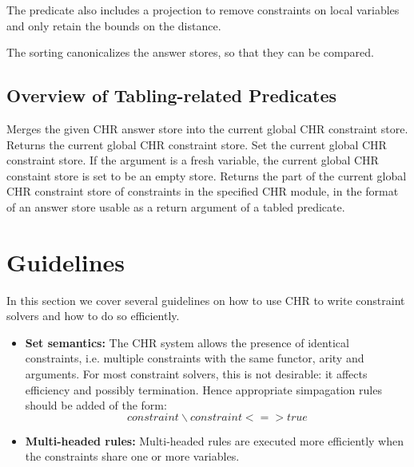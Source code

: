 The predicate also includes a projection to remove constraints on local variables 
and only retain the bounds on the distance.

The sorting canonicalizes the answer stores, so that they can be compared.

\subsection{Overview of Tabling-related Predicates}
\begin{description}
  Merges the given CHR answer store into the current global CHR constraint store.
  Returns the current global CHR constraint store.
  Set the current global CHR constraint store. If the argument is a fresh variable,
  the current global CHR constaint store is set to be an empty store.
  Returns the part of the current global CHR constraint store of constraints
  in the specified CHR module, in the format of an answer store
  usable as a return argument of a tabled predicate.
\end{description}

\section{Guidelines} \label{guidelines}

In this section we cover several guidelines on how to use CHR to write constraint solvers
and how to do so efficiently.
\begin{itemize}
\item \textbf{Set semantics:}
      The CHR system allows the presence of identical constraints, i.e. multiple constraints
      with the same functor, arity and arguments. For most constraint solvers, this is not
      desirable: it affects efficiency and possibly termination. Hence appropriate simpagation
      rules should be added of the form:
      \[ constraint \backslash constraint <=> true \]
\item \textbf{Multi-headed rules:}
      Multi-headed rules are executed more efficiently when the constraints share one or more variables.
\end{itemize}

